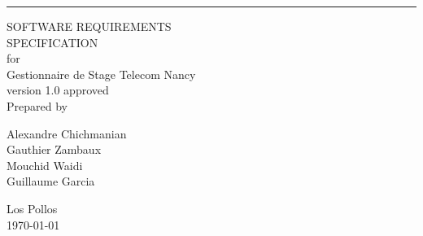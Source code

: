 \documentclass{scrreprt}
\date{}
\def\myversion{1.0 }
\begin{document}
\begin{flushright}
    \rule{15cm}{5pt}\vskip1cm
    \begin{bfseries}
        \Huge{SOFTWARE REQUIREMENTS\\ SPECIFICATION}\\
        \vspace{1.0cm}
        for\\
        \vspace{1.0cm}
        Gestionnaire de Stage Telecom Nancy\\
        \vspace{1.0cm}
        \LARGE{version \myversion approved}\\
        
        \vspace{1.0cm}
        Prepared by \\ 
        \vspace{1.0cm}
        \begin{flushleft}
        Alexandre Chichmanian \\ Gauthier Zambaux \\ Mouchid Waidi \\ Guillaume Garcia\\
        \end{flushleft}
        \vspace{1.0cm}
        Los Pollos\\
        \vspace{1.0cm}
        \today\\
    \end{bfseries}
\end{flushright}

\renewcommand{\contentsname}{Contenu}
\tableofcontents



\end{document}
